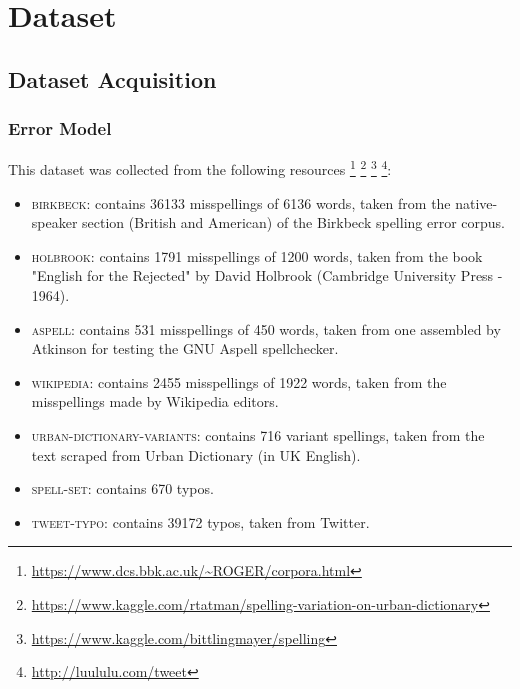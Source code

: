\chapter{Dataset}



\section{Dataset Acquisition}
\label{section:dataset-exploration}
\subsection{Error Model}
This dataset was collected from the following resources 
\footnote{\url{https://www.dcs.bbk.ac.uk/~ROGER/corpora.html}}  
\footnote{\url{https://www.kaggle.com/rtatman/spelling-variation-on-urban-dictionary}}  
\footnote{\url{https://www.kaggle.com/bittlingmayer/spelling}}
\footnote{\url{http://luululu.com/tweet}}:
\begin{itemize}
	\item \textsc{birkbeck}: contains \num{36133} misspellings of \num{6136} words, taken from the native-speaker 
	section (British and American) of the Birkbeck spelling error corpus.
	\item \textsc{holbrook}: contains \num{1791} misspellings of \num{1200} words, taken from the book "English for the 
	Rejected" by 
	David Holbrook (Cambridge University Press - 1964).
	\item \textsc{aspell}: contains \num{531} misspellings of \num{450} words, taken from one assembled by Atkinson for 
	testing the 
	GNU Aspell spellchecker.
	\item \textsc{wikipedia}: contains \num{2455} misspellings of \num{1922} words, taken from the misspellings made by 
	Wikipedia 
	editors.
	\item \textsc{urban-dictionary-variants}: contains \num{716} variant spellings, taken from the text scraped from Urban 
	Dictionary (in UK English).
	\item \textsc{spell-set}: contains \num{670} typos.
	\item \textsc{tweet-typo}: contains \num{39172} typos, taken from Twitter.
\end{itemize}


